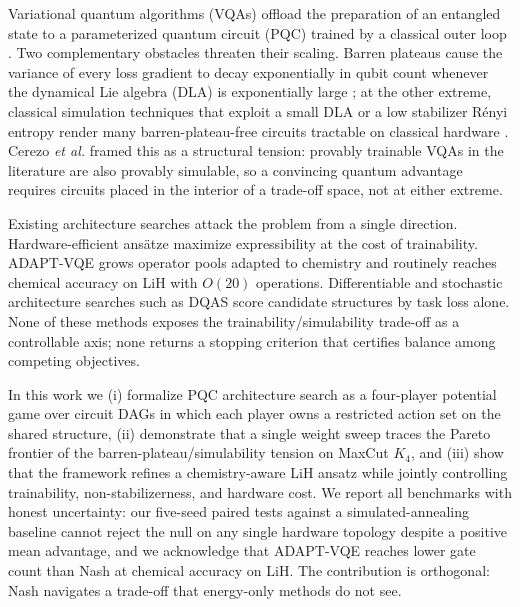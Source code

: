 \documentclass[a4paper,onecolumn,noarxiv]{quantumarticle}
\begin{document}
Variational quantum algorithms (VQAs) offload the preparation of an entangled state to a parameterized quantum circuit (PQC) trained by a classical outer loop \cite{cerezo2021variational,bharti2022noisy}. Two complementary obstacles threaten their scaling. Barren plateaus cause the variance of every loss gradient to decay exponentially in qubit count whenever the dynamical Lie algebra (DLA) is exponentially large \cite{mcclean2018barren,ragone2024lie}; at the other extreme, classical simulation techniques that exploit a small DLA or a low stabilizer R\'enyi entropy render many barren-plateau-free circuits tractable on classical hardware \cite{cerezo2025does,bravyi2016trading,leone2022stabilizer}. Cerezo \textit{et al.} \cite{cerezo2025does} framed this as a structural tension: provably trainable VQAs in the literature are also provably simulable, so a convincing quantum advantage requires circuits placed in the interior of a trade-off space, not at either extreme.

Existing architecture searches attack the problem from a single direction. Hardware-efficient ans\"atze \cite{kandala2017hea} maximize expressibility at the cost of trainability. ADAPT-VQE \cite{grimsley2019adapt} grows operator pools adapted to chemistry and routinely reaches chemical accuracy on LiH with $O(20)$ operations. Differentiable and stochastic architecture searches such as DQAS \cite{zhang2022dqas} score candidate structures by task loss alone. None of these methods exposes the trainability/simulability trade-off as a controllable axis; none returns a stopping criterion that certifies balance among competing objectives.

In this work we (i) formalize PQC architecture search as a four-player potential game over circuit DAGs in which each player owns a restricted action set on the shared structure, (ii) demonstrate that a single weight sweep traces the Pareto frontier of the barren-plateau/simulability tension on MaxCut $K_4$, and (iii) show that the framework refines a chemistry-aware LiH ansatz while jointly controlling trainability, non-stabilizerness, and hardware cost. We report all benchmarks with honest uncertainty: our five-seed paired tests against a simulated-annealing baseline cannot reject the null on any single hardware topology despite a positive mean advantage, and we acknowledge that ADAPT-VQE reaches lower gate count than Nash at chemical accuracy on LiH. The contribution is orthogonal: Nash navigates a trade-off that energy-only methods do not see.
\end{document}
